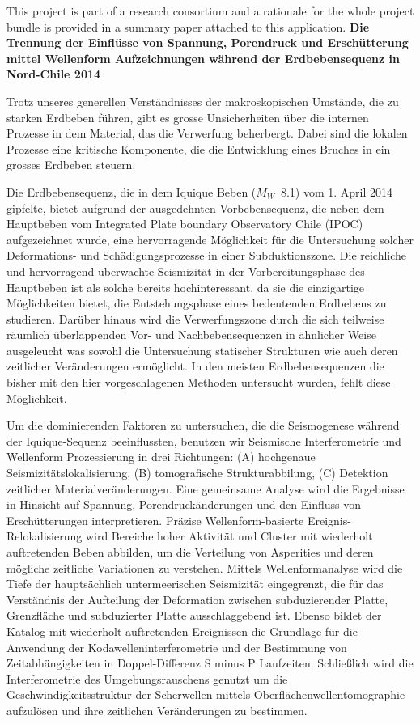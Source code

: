 \documentclass[11pt]{article}
\begin{document}
This project is part of a research consortium and a rationale for the whole project bundle is provided in a summary paper attached to this application.
\vspace*{\baselineskip}
\textbf{Die Trennung der Einflüsse von Spannung, Porendruck und Erschütterung mittel Wellenform Aufzeichnungen während der Erdbebensequenz in Nord-Chile 2014} 

Trotz unseres generellen Verständnisses der makroskopischen Umstände, die zu starken Erdbeben führen, gibt es grosse Unsicherheiten über die internen Prozesse in dem Material, das die Verwerfung beherbergt. Dabei sind die lokalen Prozesse eine kritische Komponente, die die Entwicklung eines Bruches in ein grosses Erdbeben steuern.

Die Erdbebensequenz, die in dem Iquique Beben ($M_W$~8.1) vom 1. April 2014 gipfelte, bietet aufgrund der ausgedehnten Vorbebensequenz, die neben dem Hauptbeben vom Integrated Plate boundary Observatory Chile (IPOC) aufgezeichnet wurde, eine hervorragende Möglichkeit für die Untersuchung solcher Deformations- und Schädigungsprozesse in einer Subduktionszone. Die reichliche und hervorragend überwachte Seismizität in der Vorbereitungsphase des Hauptbeben ist als solche bereits hochinteressant, da sie die einzigartige Möglichkeiten bietet, die Entstehungsphase eines bedeutenden Erdbebens zu studieren. Darüber hinaus wird die Verwerfungszone durch die sich teilweise räumlich überlappenden Vor- und Nachbebensequenzen in ähnlicher Weise ausgeleucht was sowohl die Untersuchung statischer Strukturen wie auch deren zeitlicher Veränderungen ermöglicht. In den meisten Erdbebensequenzen die bisher mit den hier vorgeschlagenen Methoden untersucht wurden, fehlt diese Möglichkeit.

Um die dominierenden Faktoren zu untersuchen, die die Seismogenese während der Iquique-Sequenz beeinflussten, benutzen wir Seismische Interferometrie und Wellenform Prozessierung in drei Richtungen: (A) hochgenaue Seismizitätslokalisierung, (B) tomografische Strukturabbilung, (C) Detektion zeitlicher Materialveränderungen. Eine gemeinsame Analyse wird die Ergebnisse in Hinsicht auf Spannung, Porendruckänderungen und den Einfluss von Erschütterungen interpretieren. Präzise Wellenform-basierte Ereignis-Relokalisierung wird Bereiche hoher Aktivität und Cluster mit wiederholt auftretenden Beben abbilden, um die Verteilung von Asperities und deren mögliche zeitliche Variationen zu verstehen. Mittels Wellenformanalyse wird die Tiefe der hauptsächlich untermeerischen Seismizität eingegrenzt, die für das Verständnis der Aufteilung der Deformation zwischen subduzierender Platte, Grenzfläche und subduzierter Platte ausschlaggebend ist. Ebenso bildet der Katalog mit wiederholt auftretenden Ereignissen die Grundlage für die Anwendung der Kodawelleninterferometrie und der Bestimmung von Zeitabhängigkeiten in Doppel-Differenz S minus P Laufzeiten. Schließlich wird die Interferometrie des Umgebungsrauschens genutzt um die Geschwindigkeitsstruktur der Scherwellen mittels Oberflächenwellentomographie  aufzulösen und ihre zeitlichen Veränderungen zu bestimmen.
\end{document}
